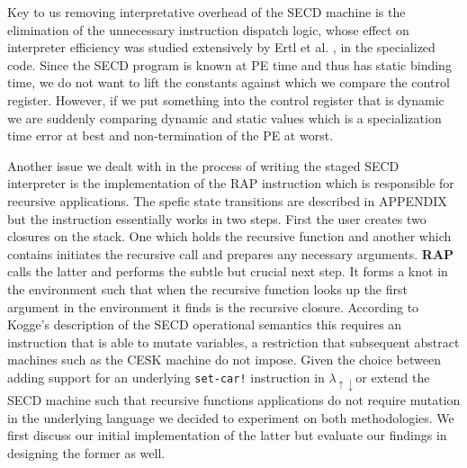 \documentclass[a4paper,12pt,twoside,openright]{report}
\theoremstyle{definition}
\newcommand{\mslang}{$\lambda_{\uparrow\downarrow}$}
\begin{document}
Key to us removing interpretative overhead of the SECD machine is the elimination of the unnecessary instruction dispatch logic, whose effect on interpreter efficiency was studied extensively by Ertl et al. \cite{ertl2003structure}, in the specialized code. Since the SECD program is known at PE time and thus has static binding time, we do not want to lift the constants against which we compare the control register. However, if we put something into the control register that is dynamic we are suddenly comparing dynamic and static values which is a specialization time error at best and non-termination of the PE at worst.

Another issue we dealt with in the process of writing the staged SECD interpreter is the implementation of the RAP instruction which is responsible for recursive applications. The spefic state transitions are described in APPENDIX but the instruction essentially works in two steps. First the user creates two closures on the stack. One which holds the recursive function and another which contains initiates the recursive call and prepares any necessary arguments. \textbf{RAP} calls the latter and performs the subtle but crucial next step. It forms a knot in the environment such that when the recursive function looks up the first argument in the environment it finds is the recursive closure. According to Kogge's \cite{kogge1990architecture} description of the SECD operational semantics this requires an instruction that is able to mutate variables, a restriction that subsequent abstract machines such as the CESK machine \cite{felleisen1987calculi} do not impose. Given the choice between adding support for an underlying \texttt{set-car!} instruction in \mslang or extend the SECD machine such that recursive functions applications do not require mutation in the underlying language we decided to experiment on both methodologies. We first discuss our initial implementation of the latter but evaluate our findings in designing the former as well.


\end{document}
